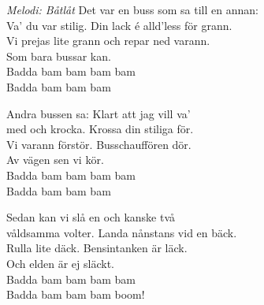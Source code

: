 {\footnotesize\textit{Melodi: Båtlåt}}
\vspace{10pt}
Det var en buss som sa till en annan:\\
Va' du var stilig. Din lack é alld'less för grann.\\
Vi prejas lite grann och repar ned varann.\\
Som bara bussar kan.\\
Badda bam bam bam bam\\
Badda bam bam bam\par
\vspace{10pt}
Andra bussen sa: Klart att jag vill va'\\
med och krocka. Krossa din stiliga för.\\
Vi varann förstör. Busschauffören dör.\\
Av vägen sen vi kör.\\
Badda bam bam bam bam\\
Badda bam bam bam\par
\vspace{10pt}
Sedan kan vi slå en och kanske två\\
våldsamma volter. Landa nånstans vid en bäck.\\
Rulla lite däck. Bensintanken är läck.\\
Och elden är ej släckt.\\
Badda bam bam bam bam\\
Badda bam bam bam boom!
